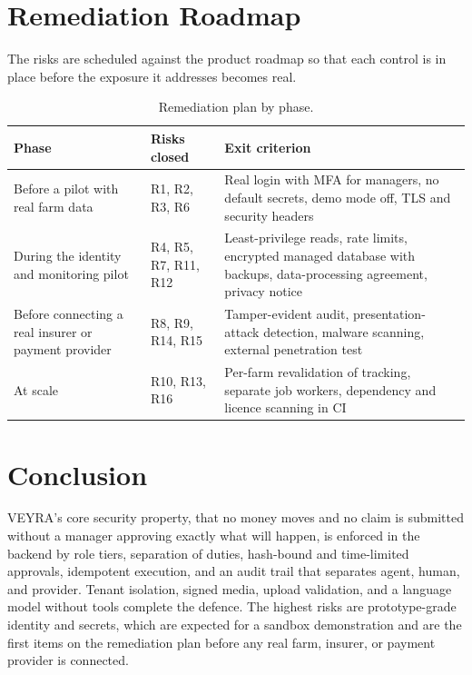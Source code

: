 \documentclass[11pt,letterpaper]{article}
\begin{document}
\section{Remediation Roadmap}

The risks are scheduled against the product roadmap so that each control is in place before the exposure it addresses becomes real.

\begin{table}[H]
\centering
\caption{Remediation plan by phase.}
\label{tab:roadmap}
\small
\begin{tabularx}{\textwidth}{>{\raggedright\arraybackslash}p{4.2cm}>{\raggedright\arraybackslash}p{2.6cm}X}
\toprule
Phase & Risks closed & Exit criterion \\
\midrule
Before a pilot with real farm data & R1, R2, R3, R6 & Real login with MFA for managers, no default secrets, demo mode off, TLS and security headers \\
During the identity and monitoring pilot & R4, R5, R7, R11, R12 & Least-privilege reads, rate limits, encrypted managed database with backups, data-processing agreement, privacy notice \\
Before connecting a real insurer or payment provider & R8, R9, R14, R15 & Tamper-evident audit, presentation-attack detection, malware scanning, external penetration test \\
At scale & R10, R13, R16 & Per-farm revalidation of tracking, separate job workers, dependency and licence scanning in CI \\
\bottomrule
\end{tabularx}
\end{table}

\section{Conclusion}

VEYRA's core security property, that no money moves and no claim is submitted without a manager approving exactly what will happen, is enforced in the backend by role tiers, separation of duties, hash-bound and time-limited approvals, idempotent execution, and an audit trail that separates agent, human, and provider. Tenant isolation, signed media, upload validation, and a language model without tools complete the defence. The highest risks are prototype-grade identity and secrets, which are expected for a sandbox demonstration and are the first items on the remediation plan before any real farm, insurer, or payment provider is connected.
\end{document}
